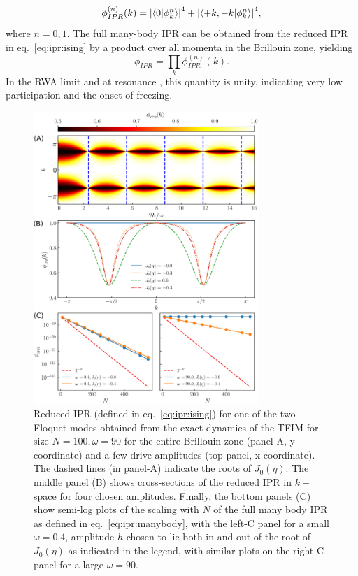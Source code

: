 \documentclass[%
reprint,
superscriptaddress,
amsmath,amssymb,
aps,
prb,
showkeys,
]{revtex4-2}
\begin{document}
\begin{equation}
	\label{eq:ipr:ising}
	\phi^{(n)}_{IPR}(k) = \abs{\ip{0}{\phi^n_k}}^4 + \abs{\ip{ +k, -k }{\phi^n_k}}^4,
\end{equation}
where $n=0,1$. {The full many-body IPR can be obtained from the reduced IPR in eq.}~\ref{eq:ipr:ising} {by a product over all momenta in the Brillouin zone, yielding}
\begin{equation}
	\label{eq:ipr:manybody}
	\phi_{IPR} = \prod_k \phi^{(n)}_{IPR}(k).
\end{equation}
In the RWA limit and at resonance , this quantity is unity, indicating very low participation and the onset of freezing.
\begin{figure}[t!]
	\centering
	\includegraphics[width = 8.5cm]{ising_exact_ipr_3panel.jpeg}
	\caption{Reduced IPR (defined in eq.~\ref{eq:ipr:ising}) {for one of the two Floquet modes obtained from the exact dynamics of the TFIM for size} $N = 100, \omega=90$ {for the entire Brillouin zone (panel A, y-coordinate) and a few drive amplitudes (top panel, x-coordinate). The dashed lines (in panel-A) indicate the roots of} $J_0(\eta)${. The middle panel (B) shows cross-sections of the reduced IPR in} $k-$ {space for four chosen amplitudes. Finally, the bottom panels (C) show semi-log plots of the scaling with} $N$ {of the full many body IPR as defined in eq.}~\ref{eq:ipr:manybody}{, with the left-C panel for a small} $\omega=0.4$, amplitude $h$ {chosen to lie both in and out of the root of} $J_0(\eta)$ {as indicated in the legend, with similar plots on the right-C panel for a large} $\omega=90$. }
	\label{fig:ipr:tfim}
\end{figure}
\end{document}
